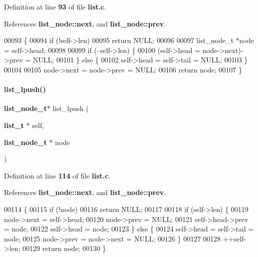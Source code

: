 Definition at line \textbf{ 93} of file \textbf{ list.\+c}.



References \textbf{ list\+\_\+node\+::next}, and \textbf{ list\+\_\+node\+::prev}.


\begin{DoxyCode}
00093                                      \{
00094   \textcolor{keywordflow}{if} (!self->len)
00095     \textcolor{keywordflow}{return} NULL;
00096 
00097   list_node_t *node = \textcolor{keyword}{self}->head;
00098 
00099   \textcolor{keywordflow}{if} (--self->len) \{
00100     (\textcolor{keyword}{self}->head = node->next)->prev = NULL;
00101   \} \textcolor{keywordflow}{else} \{
00102     \textcolor{keyword}{self}->head = \textcolor{keyword}{self}->tail = NULL;
00103   \}
00104 
00105   node->next = node->prev = NULL;
00106   \textcolor{keywordflow}{return} node;
00107 \}
\end{DoxyCode}
\mbox{\label{a00110_a7e1b077416813dd474a54826347f7502}} 
\paragraph{list\+\_\+lpush()}
{\footnotesize\ttfamily \textbf{ list\+\_\+node\+\_\+t}$\ast$ list\+\_\+lpush (\begin{DoxyParamCaption}\item[{\textbf{ list\+\_\+t} $\ast$}]{self,  }\item[{\textbf{ list\+\_\+node\+\_\+t} $\ast$}]{node }\end{DoxyParamCaption})}



Definition at line \textbf{ 114} of file \textbf{ list.\+c}.



References \textbf{ list\+\_\+node\+::next}, and \textbf{ list\+\_\+node\+::prev}.


\begin{DoxyCode}
00114                                                          \{
00115   \textcolor{keywordflow}{if} (!node)
00116     \textcolor{keywordflow}{return} NULL;
00117 
00118   \textcolor{keywordflow}{if} (self->len) \{
00119     node->next = \textcolor{keyword}{self}->head;
00120     node->prev = NULL;
00121     \textcolor{keyword}{self}->head->prev = node;
00122     \textcolor{keyword}{self}->head = node;
00123   \} \textcolor{keywordflow}{else} \{
00124     \textcolor{keyword}{self}->head = \textcolor{keyword}{self}->tail = node;
00125     node->prev = node->next = NULL;
00126   \}
00127 
00128   ++\textcolor{keyword}{self}->len;
00129   \textcolor{keywordflow}{return} node;
00130 \}
\end{DoxyCode}
\mbox{\label{a00110_a9dd3eafdb56dcc64689f78fb4acdff3f}} 
